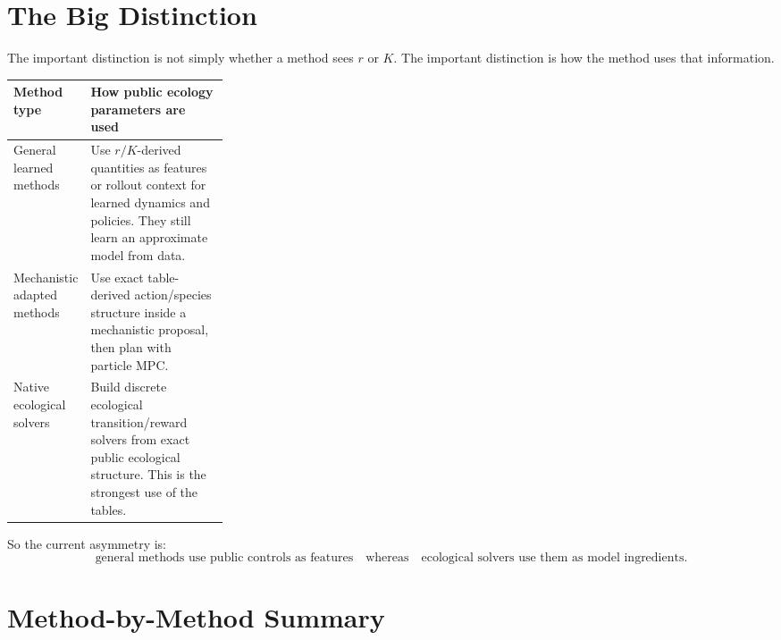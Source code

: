\documentclass[11pt]{article}
\begin{document}
\section{The Big Distinction}

The important distinction is not simply whether a method sees \(r\) or \(K\).
The important distinction is how the method uses that information.

\begin{center}
\begin{tabularx}{\linewidth}{p{0.28\linewidth}X}
\toprule
Method type & How public ecology parameters are used \\
\midrule
General learned methods & Use \(r/K\)-derived quantities as features or rollout context for learned dynamics and policies. They still learn an approximate model from data. \\
Mechanistic adapted methods & Use exact table-derived action/species structure inside a mechanistic proposal, then plan with particle MPC. \\
Native ecological solvers & Build discrete ecological transition/reward solvers from exact public ecological structure. This is the strongest use of the tables. \\
\bottomrule
\end{tabularx}
\end{center}

So the current asymmetry is:
\[
\text{general methods use public controls as features}
\quad\text{whereas}\quad
\text{ecological solvers use them as model ingredients.}
\]

\section{Method-by-Method Summary}
\end{document}
